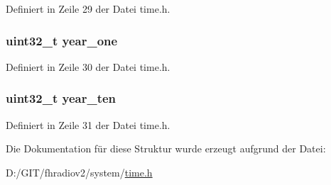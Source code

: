 Definiert in Zeile 29 der Datei time.\+h.

\hypertarget{structtime__date_a55217c761921c4b4443fb1d4dee3f564}{}
\subsubsection[{year\+\_\+one}]{\setlength{\rightskip}{0pt plus 5cm}uint32\+\_\+t year\+\_\+one}\label{structtime__date_a55217c761921c4b4443fb1d4dee3f564}


Definiert in Zeile 30 der Datei time.\+h.

\hypertarget{structtime__date_a124f7250b4c2e15669a832132940840d}{}
\subsubsection[{year\+\_\+ten}]{\setlength{\rightskip}{0pt plus 5cm}uint32\+\_\+t year\+\_\+ten}\label{structtime__date_a124f7250b4c2e15669a832132940840d}


Definiert in Zeile 31 der Datei time.\+h.



Die Dokumentation für diese Struktur wurde erzeugt aufgrund der Datei\+:\begin{DoxyCompactItemize}
\item 
D\+:/\+G\+I\+T/fhradiov2/system/\hyperlink{system_2time_8h}{time.\+h}\end{DoxyCompactItemize}
